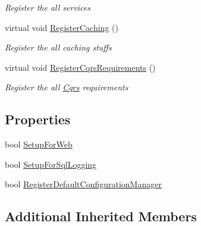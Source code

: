 \begin{DoxyCompactItemize}
\begin{DoxyCompactList}\small\item\em Register the all services \end{DoxyCompactList}\item 
virtual void \hyperlink{classCqrs_1_1Ninject_1_1Configuration_1_1CqrsModule_a6ca61a712ab7efc28eb38e7f74853e3e_a6ca61a712ab7efc28eb38e7f74853e3e}{Register\+Caching} ()
\begin{DoxyCompactList}\small\item\em Register the all caching stuffs \end{DoxyCompactList}\item 
virtual void \hyperlink{classCqrs_1_1Ninject_1_1Configuration_1_1CqrsModule_a61a20168f5dc9dab74bb2f7fad7c0adb_a61a20168f5dc9dab74bb2f7fad7c0adb}{Register\+Cqrs\+Requirements} ()
\begin{DoxyCompactList}\small\item\em Register the all \hyperlink{namespaceCqrs}{Cqrs} requirements \end{DoxyCompactList}\end{DoxyCompactItemize}
\subsection*{Properties}
\begin{DoxyCompactItemize}
\item 
bool \hyperlink{classCqrs_1_1Ninject_1_1Configuration_1_1CqrsModule_ae4bbc2d44f283644a328d308dc78edc5_ae4bbc2d44f283644a328d308dc78edc5}{Setup\+For\+Web}
\item 
bool \hyperlink{classCqrs_1_1Ninject_1_1Configuration_1_1CqrsModule_a10e7a8adbe03fc05ebb7003727cbe541_a10e7a8adbe03fc05ebb7003727cbe541}{Setup\+For\+Sql\+Logging}
\item 
bool \hyperlink{classCqrs_1_1Ninject_1_1Configuration_1_1CqrsModule_a7e5a1cbb5bcfda3bcc06dc24a38995e2_a7e5a1cbb5bcfda3bcc06dc24a38995e2}{Register\+Default\+Configuration\+Manager}
\end{DoxyCompactItemize}
\subsection*{Additional Inherited Members}


